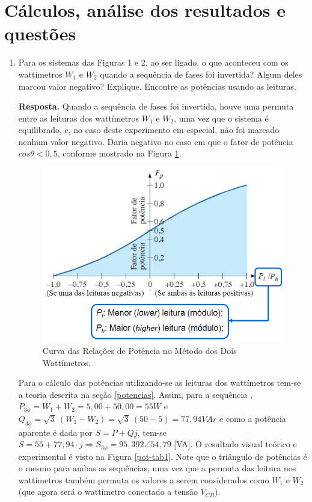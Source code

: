 \documentclass[a4paper,12pt,oneside,openany,table,xcdraw]{article}
\begin{document}
\section{Cálculos, análise dos resultados e questões} %
\begin{enumerate}[1)]
\item Para os sistemas das Figuras 1 e 2, ao ser ligado, o que aconteceu com os wattímetros $W_1$ e $W_2$ quando a sequência de fases foi invertida? Algum deles marcou valor negativo? Explique. Encontre as potências usando as leituras. 

\vspace{0.8mm}
\textbf{Resposta.} Quando  a sequência de fases foi invertida, houve uma permuta entre as leituras dos wattímetros $W_1$ e $W_2$, uma vez que o sistema é equilibrado, e, no caso deste experimento em especial, não foi marcado nenhum valor negativo. Daria negativo no caso em que o fator de potência $cos \theta <0,5$, conforme mostrado na Figura \ref{fp}. %
\begin{figure}[H]
\centering
\captionsetup{font=scriptsize}
\includegraphics[width=14cm]{fp}
\caption{Curva das Relações de Potência no Método dos Dois Wattímetros.}
\label{fp}
\end{figure}

Para o cálculo das potências utilizando-se as leituras dos wattímetros tem-se a teoria descrita na seção \ref{potencias}. Assim, para a sequência , $P_{3\phi}=W_1+W_2 = 5,00 + 50,00 = 55 W$ e $Q_{3\phi} = \sqrt{3}\ (W_1 - W_2) = \sqrt{3}\ (50 - 5) = 77,94 VAr$ e como a potência aparente é dada por $S=P+Qj$, tem-se $S= 55 + 77,94\cdot j \Rightarrow S_{3\phi} = 95,392\angle 54,79$ [VA]. O resultado visual teórico e experimental é visto na Figura \ref{pot-tab1}. Note que o triângulo de potências é o mesmo para ambas as sequências, uma vez que a permuta das leitura nos wattímetros também permuta os valores a serem considerados como $W_1$ e $W_2$ (que agora será o wattímetro conectado a tensão $V_{CB}$). %


\end{enumerate}
\end{document}
